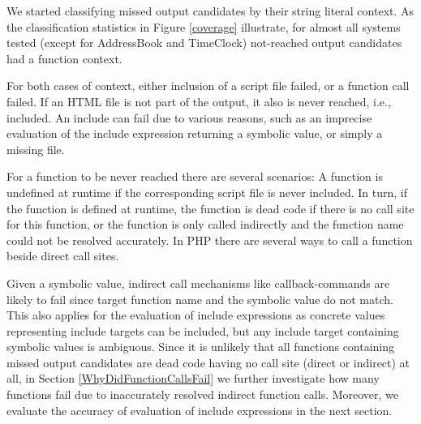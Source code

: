 \documentclass[sigconf]{acmart}
\begin{document}
We started classifying missed output candidates by their string literal
context. As the classification statistics in Figure \ref{coverage} illustrate,
for almost all systems tested (except for \textsf{AddressBook} and
\textsf{TimeClock}) not-reached output candidates had a function context. 


For both cases of context, either inclusion of a script file failed, or a
function call failed. If an HTML file is not part of the output, it also is
never reached, i.e., included. An include can fail due to various reasons, such
as an imprecise evaluation of the include expression returning a symbolic
value, or simply a missing file.

For a function to be never reached there are several scenarios: A function is
undefined at runtime if the corresponding script file is never included. In
turn, if the function is defined at runtime, the function is dead
code if there is no call site for this function, or the function is only called
indirectly and the function name could not be resolved accurately. In PHP there
are several ways to call a function beside direct call sites. 

Given a symbolic value, indirect call mechanisms like callback-commands are
likely to fail since target function name and the symbolic value do not match.
This also applies for the evaluation of include expressions as concrete values
representing include targets can be included, but any include target containing
symbolic values is ambiguous. Since it is unlikely that all functions containing
missed output candidates are dead code having no call site (direct or
indirect) at all, in Section \ref{WhyDidFunctionCallsFail} we further
investigate how many functions fail due to inaccurately resolved indirect
function calls. Moreover, we evaluate the accuracy of evaluation of include
expressions in the next section.
\end{document}
